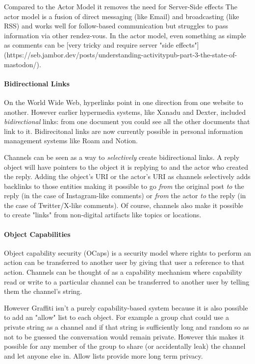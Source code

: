 Compared to the Actor Model it removes the need for Server-Side effects
The actor model is a fusion of direct messaging (like Email) and broadcasting
(like RSS) and works well for follow-based communication but struggles
to pass information via other rendez-vous.
In the actor model, even something as simple as comments can be
[very tricky and require server "side effects"](https://seb.jambor.dev/posts/understanding-activitypub-part-3-the-state-of-mastodon/).

\paragraph{Bidirectional Links}

On the World Wide Web, hyperlinks point in one direction from one website to another.
However earlier hypermedia systems, like Xanadu and Dexter, included \emph{bidirectional} links:
from one document you could see all the other documents that link to it.
Bidirecitonal links are now currently possible in personal information management systems like Roam and Notion.

Channels can be seen as a way to \emph{selectively} create bidirectional links.
A reply object will have pointers to the object it is replying to and the actor who created the reply.
Adding the object's URI or the actor's URI as channels selectively adds backlinks to those entities
making it possible to go \emph{from} the original post \emph{to} the reply (in the case of Instagram-like comments)
or \emph{from} the actor \emph{to} the reply (in the case of Twitter/X-like comments).
Of course, channels also make it possible to create "links" from non-digital artifacts like topics or locations.

\paragraph{Object Capabilities}

Object capability security (OCaps) is a security model where rights to perform an action
can be transferred to another user by giving that user a reference to that action.
Channels can be thought of as a capability mechanism where
capability read or write to a particular channel
can be transferred to another user by telling them the channel's string.

However Graffiti isn't a purely capability-based system because it
is also possible to add an "allow" list to each object.
For example a group chat could use a private string as a channel
and if that string is sufficiently long and random so as not to be guessed
the conversation would remain private.
However this makes it possible for any member of the group to share (or accidentally leak) the
channel and let anyone else in.
Allow lists provide more long term privacy.

